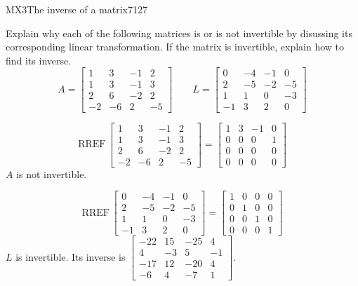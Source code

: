 \begin{exercise}{MX3}{The inverse of a matrix}{7127} 
\begin{exerciseStatement} 

 Explain why each of the following matrices is or is not invertible by disussing its corresponding linear transformation. If the matrix is invertible, explain how to find its inverse. \[
\hspace{2em}
A = \left[\begin{array}{cccc}
1 & 3 & -1 & 2 \\
1 & 3 & -1 & 3 \\
2 & 6 & -2 & 2 \\
-2 & -6 & 2 & -5
\end{array}\right]
\hspace{2em}
L = \left[\begin{array}{cccc}
0 & -4 & -1 & 0 \\
2 & -5 & -2 & -5 \\
1 & 1 & 0 & -3 \\
-1 & 3 & 2 & 0
\end{array}\right]
\hspace{2em}
        \] 

 \end{exerciseStatement}
 \begin{exerciseAnswer} 

 \[\mathrm{RREF}\,\left[\begin{array}{cccc}
1 & 3 & -1 & 2 \\
1 & 3 & -1 & 3 \\
2 & 6 & -2 & 2 \\
-2 & -6 & 2 & -5
\end{array}\right]=\left[\begin{array}{cccc}
1 & 3 & -1 & 0 \\
0 & 0 & 0 & 1 \\
0 & 0 & 0 & 0 \\
0 & 0 & 0 & 0
\end{array}\right]\] \(A\) is not invertible. 

 

 \[\mathrm{RREF}\,\left[\begin{array}{cccc}
0 & -4 & -1 & 0 \\
2 & -5 & -2 & -5 \\
1 & 1 & 0 & -3 \\
-1 & 3 & 2 & 0
\end{array}\right]=\left[\begin{array}{cccc}
1 & 0 & 0 & 0 \\
0 & 1 & 0 & 0 \\
0 & 0 & 1 & 0 \\
0 & 0 & 0 & 1
\end{array}\right]\] \(L\) is invertible. Its inverse is \(\left[\begin{array}{cccc}
-22 & 15 & -25 & 4 \\
4 & -3 & 5 & -1 \\
-17 & 12 & -20 & 4 \\
-6 & 4 & -7 & 1
\end{array}\right]\). 

 \end{exerciseAnswer}
 \end{exercise}



